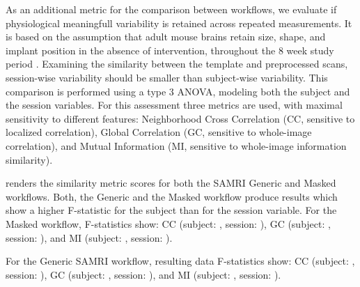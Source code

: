 As an additional metric for the comparison between workflows, we evaluate if physiological meaningfull variability is retained across repeated measurements.
It is based on the assumption that adult mouse brains retain size, shape, and implant position in the absence of intervention, throughout the 8 week study period \cite{ioanas_optimized_2019}.
Examining the similarity between the template and preprocessed scans, session-wise variability should be smaller than subject-wise variability.
This comparison is performed using a type 3 ANOVA, modeling both the subject and the session variables.
For this assessment three metrics are used, with maximal sensitivity to different features:
Neighborhood Cross Correlation (CC, sensitive to localized correlation),
Global Correlation (GC, sensitive to whole-image correlation),
and Mutual Information (MI, sensitive to whole-image information similarity).

 renders the similarity metric scores for both the SAMRI Generic and Masked workflows.
Both, the Generic and the Masked workflow produce results which show a higher F-statistic for the subject than for the session variable.
For the Masked workflow, F-statistics show:
CC (subject: , session: ),
GC (subject: , session: ),
and MI (subject: , session: ).

For the Generic SAMRI workflow, resulting data F-statistics show:
CC (subject: , session: ),
GC (subject: , session: ),
and MI (subject: , session: ).
